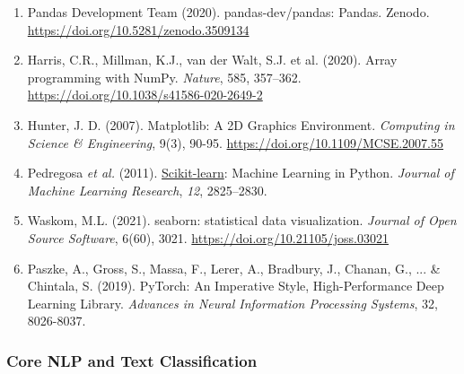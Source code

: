\documentclass[
]{article}
\begin{document}
\begin{enumerate}
\def\labelenumi{\arabic{enumi}.}
\item
  Pandas Development Team (2020). pandas-dev/pandas: Pandas. Zenodo.
  \url{https://doi.org/10.5281/zenodo.3509134}
\item
  Harris, C.R., Millman, K.J., van der Walt, S.J. et al. (2020). Array
  programming with NumPy. \emph{Nature}, 585, 357--362.
  \url{https://doi.org/10.1038/s41586-020-2649-2}
\item
  Hunter, J. D. (2007). Matplotlib: A 2D Graphics Environment.
  \emph{Computing in Science \& Engineering}, 9(3), 90-95.
  \url{https://doi.org/10.1109/MCSE.2007.55}
\item
  Pedregosa \emph{et al.} (2011).
  \href{https://scikit-learn.org/}{Scikit-learn}: Machine Learning in
  Python. \emph{Journal of Machine Learning Research}, \emph{12},
  2825--2830.
\item
  Waskom, M.L. (2021). seaborn: statistical data visualization.
  \emph{Journal of Open Source Software}, 6(60), 3021.
  \url{https://doi.org/10.21105/joss.03021}
\item
  Paszke, A., Gross, S., Massa, F., Lerer, A., Bradbury, J., Chanan, G.,
  ... \& Chintala, S. (2019). PyTorch: An Imperative Style,
  High-Performance Deep Learning Library. \emph{Advances in Neural
  Information Processing Systems}, 32, 8026-8037.
\end{enumerate}

\subsubsection{Core NLP and Text
Classification}\label{core-nlp-and-text-classification}
\end{document}
